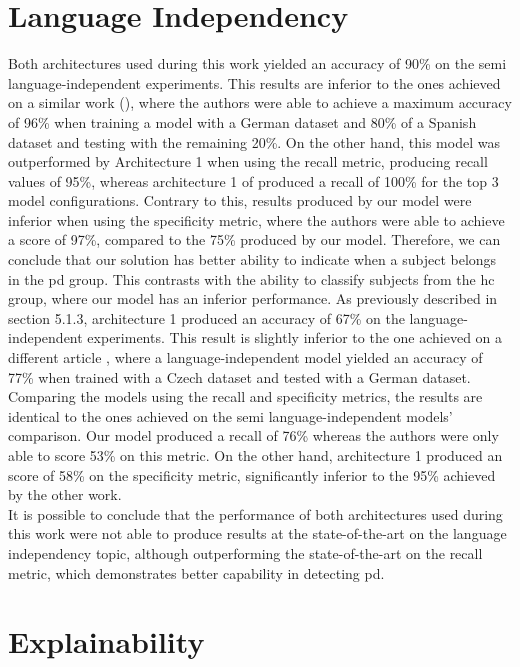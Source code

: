 \section{Language Independency}

Both architectures used during this work yielded an accuracy of 90\% on the semi language-independent experiments. This results are inferior to the ones achieved on a similar work (\cite{parkinson_three_languages}), where the authors were able to achieve a maximum accuracy of 96\% when training a model with a German dataset and 80\% of a Spanish dataset and testing with the remaining 20\%. On the other hand, this model was outperformed by Architecture 1 when using the recall metric, producing recall values  of 95\%, whereas architecture 1 of produced a recall of 100\% for the top 3 model configurations. Contrary to this, results produced by our model were inferior when using the specificity metric, where the authors were able to achieve a score of 97\%, compared to the 75\% produced by our model. Therefore, we can conclude that our solution has better ability to indicate when a subject belongs in the \gls{pd} group. This contrasts with the ability to classify subjects from the \gls{hc} group, where our model has an inferior performance. As previously described in section 5.1.3, architecture 1 produced an accuracy of 67\% on the language-independent experiments. This result is slightly inferior to the one achieved on a different article \cite{parkinson_three_languages}, where a language-independent model yielded an accuracy of 77\% when trained with a Czech dataset and tested with a German dataset. Comparing the models using the recall and specificity metrics, the results are identical to the ones achieved on the semi language-independent models' comparison. Our model produced a recall of 76\% whereas the authors were only able to score 53\% on this metric. On the other hand, architecture 1 produced an score of 58\% on the specificity metric, significantly inferior to the 95\% achieved by the other work. \\
It is possible to conclude that the performance of both architectures used during this work were not able to produce results at the state-of-the-art on the language independency topic, although outperforming the state-of-the-art on the recall metric, which demonstrates better capability in detecting \gls{pd}.

\section{Explainability}


